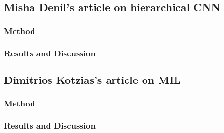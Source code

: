 \subsection{Misha Denil's article on hierarchical CNN}
\subsubsection{Method}

\subsubsection{Results and Discussion}


\subsection{Dimitrios Kotzias's article on MIL}
\subsubsection{Method}

\subsubsection{Results and Discussion}

